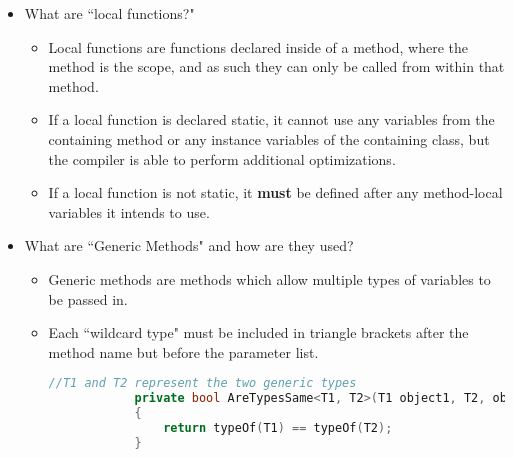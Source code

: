 \documentclass{article}
\begin{document}
\begin{itemize}
\begin{itemize}
\begin{lstlisting}[language=C++]
                //Risky because if otherParam is ever moved or removed the old function calls                will still work in unintended ways
                private void myFunc(int otherParam, params int[] numsToAdd);
                myFunc(1,1,2,...,x)

                //Less risky, as the old function calls will now throw errors
                private void myFunc(int otherParam, params int[] numsToAdd);
                myFunc(otherParam: 1, 1,2,...,x)
                \end{lstlisting}
    \end{itemize}
     \item What are ``local functions?"
    \begin{itemize}
        \item Local functions are functions declared inside of a method, where the method is the scope, and as such they can only be called from within that method.
        \item If a local function is declared static, it cannot use any variables from the containing method or any instance variables of the containing class, but the compiler is able to perform additional optimizations.
        \item If a local function is not static, it \textbf{must} be defined after any method-local variables it intends to use.
    \end{itemize}
    \item What are ``Generic Methods" and how are they used?
    \begin{itemize}
        \item Generic methods are methods which allow multiple types of variables to be passed in.
        \item Each ``wildcard type" must be included in triangle brackets after the method name but before the parameter list.
        \begin{lstlisting}[language=C++]
            //T1 and T2 represent the two generic types 
            private bool AreTypesSame<T1, T2>(T1 object1, T2, object2)
            {
                return typeOf(T1) == typeOf(T2);
            }\end{lstlisting}
    \end{itemize}
\end{itemize}
\end{document}
